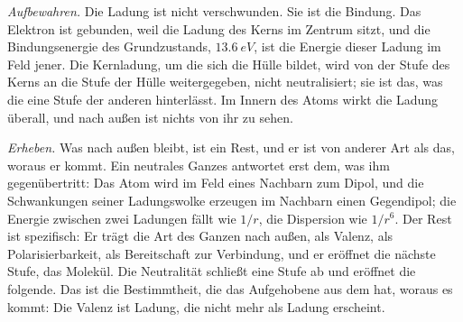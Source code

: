 \documentclass[11pt,a4paper]{article}
\begin{document}
\emph{Aufbewahren.} Die Ladung ist nicht verschwunden. Sie ist die Bindung. Das Elektron ist gebunden, weil die Ladung des Kerns im Zentrum sitzt, und die Bindungsenergie des Grundzustands, $\SI{13.6}{eV}$, ist die Energie dieser Ladung im Feld jener. Die Kernladung, um die sich die Hülle bildet, wird von der Stufe des Kerns an die Stufe der Hülle weitergegeben, nicht neutralisiert; sie ist das, was die eine Stufe der anderen hinterlässt. Im Innern des Atoms wirkt die Ladung überall, und nach außen ist nichts von ihr zu sehen.

\emph{Erheben.} Was nach außen bleibt, ist ein Rest, und er ist von anderer Art als das, woraus er kommt. Ein neutrales Ganzes antwortet erst dem, was ihm gegenübertritt: Das Atom wird im Feld eines Nachbarn zum Dipol, und die Schwankungen seiner Ladungswolke erzeugen im Nachbarn einen Gegendipol; die Energie zwischen zwei Ladungen fällt wie $1/r$, die Dispersion wie $1/r^6$. Der Rest ist spezifisch: Er trägt die Art des Ganzen nach außen, als Valenz, als Polarisierbarkeit, als Bereitschaft zur Verbindung, und er eröffnet die nächste Stufe, das Molekül. Die Neutralität schließt eine Stufe ab und eröffnet die folgende. Das ist die Bestimmtheit, die das Aufgehobene aus dem hat, woraus es kommt: Die Valenz ist Ladung, die nicht mehr als Ladung erscheint.
\end{document}
